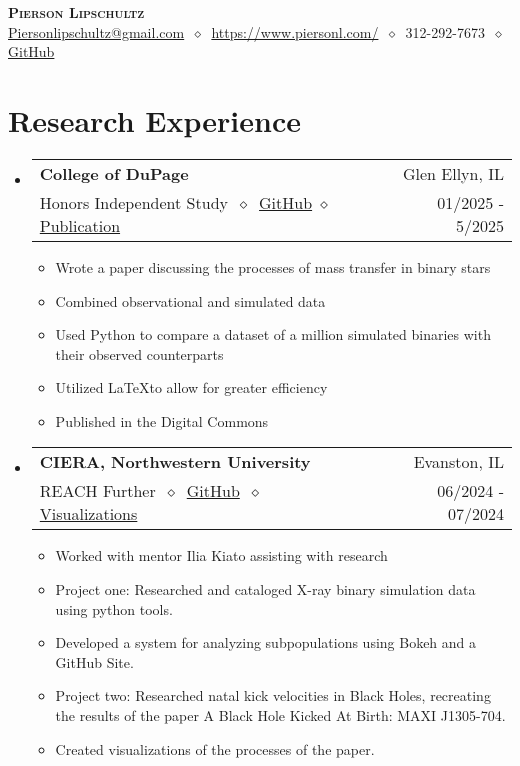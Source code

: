 \documentclass[letterpaper,11pt]{article}
\makeatletter
\newcommand{\cvitem}[1]{
  \item\small{
    {#1\vspace{-2pt}}
  }
}
\newcommand{\cvheading}[4]{
  \vspace{-2pt}\item
    \begin{tabular*}{\textwidth}[t]{l@{\extracolsep{\fill}}r}
      \textbf{#1} & #2 \\
      \small#3 & \small #4 \\
    \end{tabular*}\vspace{-7pt}
}
\newcommand{\cvheadingstart}{\begin{itemize}[leftmargin=0in, label={}]}
\newcommand{\cvheadingend}{\end{itemize}}
\newcommand{\cvitemstart}{\begin{itemize}[label=\textopenbullet]\justifying}
\newcommand{\cvitemend}{\end{itemize}\vspace{-5pt}}
\makeatother
\begin{document}
\begin{center}
  \textbf{\LARGE\scshape Pierson Lipschultz} \\
  \vspace{1pt}\small
  \href{mailto:}{Piersonlipschultz@gmail.com}
  $\ \diamond\ $
  \href{https://www.piersonl.com/}{https://www.piersonl.com/}
  $\ \diamond\ $ 
  312-292-7673
  $\ \diamond\ $
  \href{https://github.com/PiersonLip}{GitHub}
\end{center}

\section{Research Experience}
\cvheadingstart
  \cvheading
    {College of DuPage}{Glen Ellyn, IL}
    {Honors Independent Study $\ \diamond\ $ \href{https://github.com/PiersonLip/Honors-Independent-Study}{GitHub} $\diamond$ \href{https://dc.cod.edu/srs/2025/schedule/25/}{Publication}}{01/2025 - 5/2025}
  \cvitemstart
    \cvitem{Wrote a paper discussing the processes of mass transfer in binary stars}
    \cvitem{Combined observational and simulated data}
    \cvitem{Used Python to compare a dataset of a million simulated binaries with their observed counterparts}
    \cvitem{Utilized \LaTeX to allow for greater efficiency}
    \cvitem{Published in the Digital Commons}
  \cvitemend

  \cvheading
    {CIERA, Northwestern University}{Evanston, IL}
    {REACH Further $\ \diamond\ $ \href{https://piersonlip.github.io/XB/}{GitHub} $\ \diamond\ $ \href{https://youtube.com/playlist?list=PLq73rWo79HTuEUPYdUz11PpY6DLhuF9Wl\&si=VjHikj-V-IePgofn}{Visualizations}}{06/2024 - 07/2024}

  \cvitemstart
    \cvitem{Worked with mentor Ilia Kiato assisting with research}
    \cvitem{Project one: Researched and cataloged X-ray binary simulation data using python tools.}
    \cvitem{Developed a system for analyzing subpopulations using Bokeh and a GitHub Site.}
    \cvitem{Project two: Researched natal kick velocities in Black Holes, recreating the results of the paper A Black Hole Kicked At Birth: MAXI J1305-704.}
    \cvitem{Created visualizations of the processes of the paper.}
  \cvitemend


\cvheadingend
\end{document}
